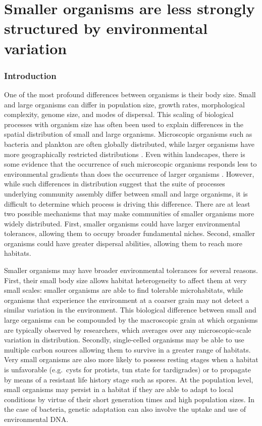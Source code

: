\chapter{Smaller organisms are less strongly structured by environmental variation}
\label{chap:organism-size}

\subsection{Introduction}\label{introduction}

One of the most profound differences between organisms is their body
size. Small and large organisms can differ in population size, growth
rates, morphological complexity, genome size, and modes of dispersal.
This scaling of biological processes with organism size has often been
used to explain differences in the spatial distribution of small and
large organisms. Microscopic organisms such as bacteria and plankton are
often globally distributed, while larger organisms have more
geographically restricted distributions \citep{Fenchel2004}. Even within
landscapes, there is some evidence that the occurrence of such
microscopic organisms responds less to environmental gradients than does
the occurrence of larger organisms \citep{Farjalla2012, Fierer2011}.
However, while such differences in distribution suggest that the suite
of processes underlying community assembly differ between small and
large organisms, it is difficult to determine which process is driving
this difference. There are at least two possible mechanisms that may
make communities of smaller organisms more widely distributed. First,
smaller organisms could have larger environmental tolerances, allowing
them to occupy broader fundamental niches. Second, smaller organisms
could have greater dispersal abilities, allowing them to reach more
habitats.

Smaller organisms may have broader environmental tolerances for several
reasons. First, their small body size allows habitat heterogeneity to
affect them at very small scales: smaller organisms are able to find
tolerable microhabitats, while organisms that experience the environment
at a coarser grain may not detect a similar variation in the
environment. This biological difference between small and large
organisms can be compounded by the macroscopic grain at which organisms
are typically observed by researchers, which averages over any
microscopic-scale variation in distribution. Secondly, single-celled
organisms may be able to use multiple carbon sources
\citep{Langenheder2007} allowing them to survive in a greater range of
habitats. Very small organisms are also more likely to possess resting
stages when a habitat is unfavorable (e.g.~cysts for protists, tun state
for tardigrades) or to propagate by means of a resistant life history
stage such as spores. At the population level, small organisms may
persist in a habitat if they are able to adapt to local conditions by
virtue of their short generation times and high population sizes. In the
case of bacteria, genetic adaptation can also involve the uptake and use
of environmental DNA.


